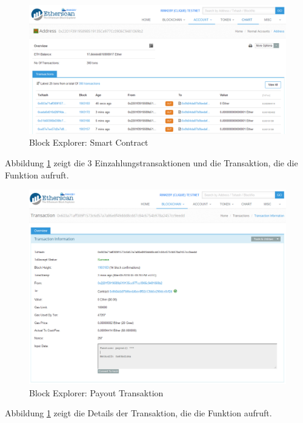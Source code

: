 \begin{figure}[H]
\centering
\includegraphics[width=1\linewidth]{Figures/eth_gui/contract_transactions}
\decoRule
\caption{Block Explorer: Smart Contract}
\label{fig:contract_transactions}
\end{figure}

Abbildung \ref{fig:contract_transactions} zeigt die 3 Einzahlungstransaktionen und die Transaktion, die die  Funktion aufruft.

\begin{figure}[H]
\centering
\includegraphics[width=1\linewidth]{Figures/eth_gui/contract_payout_txn}
\decoRule
\caption{Block Explorer: Payout Transaktion}
\label{fig:contract_payout_txn}
\end{figure}

Abbildung \ref{fig:contract_transactions} zeigt die Details der Transaktion, die die  Funktion aufruft.